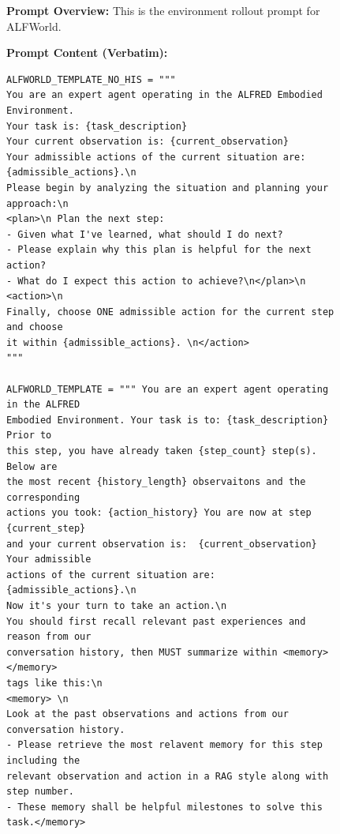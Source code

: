 \begin{figure}[htbp]
\centering
\vspace{-8mm}
\begin{tcolorbox}[
    title=\textbf{Environment Rollout Prompt - ALFWorld },
    colback=orange!1!white,
    colframe=orange!50!black,
    fonttitle=\bfseries,
]
\small

\textbf{Prompt Overview:}  
This is the environment rollout prompt for ALFWorld.

\vspace{2mm}

\textbf{Prompt Content (Verbatim):}
\begin{verbatim}
ALFWORLD_TEMPLATE_NO_HIS = """
You are an expert agent operating in the ALFRED Embodied Environment.
Your task is: {task_description}
Your current observation is: {current_observation}
Your admissible actions of the current situation are: 
{admissible_actions}.\n
Please begin by analyzing the situation and planning your approach:\n
<plan>\n Plan the next step:
- Given what I've learned, what should I do next?
- Please explain why this plan is helpful for the next action?
- What do I expect this action to achieve?\n</plan>\n
<action>\n
Finally, choose ONE admissible action for the current step and choose 
it within {admissible_actions}. \n</action>
"""

ALFWORLD_TEMPLATE = """ You are an expert agent operating in the ALFRED 
Embodied Environment. Your task is to: {task_description} Prior to 
this step, you have already taken {step_count} step(s). Below are 
the most recent {history_length} observaitons and the corresponding 
actions you took: {action_history} You are now at step {current_step} 
and your current observation is:  {current_observation} Your admissible 
actions of the current situation are: {admissible_actions}.\n
Now it's your turn to take an action.\n
You should first recall relevant past experiences and reason from our 
conversation history, then MUST summarize within <memory> </memory> 
tags like this:\n
<memory> \n 
Look at the past observations and actions from our conversation history.
- Please retrieve the most relavent memory for this step including the 
relevant observation and action in a RAG style along with step number.
- These memory shall be helpful milestones to solve this task.</memory>


\end{verbatim}
\end{tcolorbox}
\end{figure}
